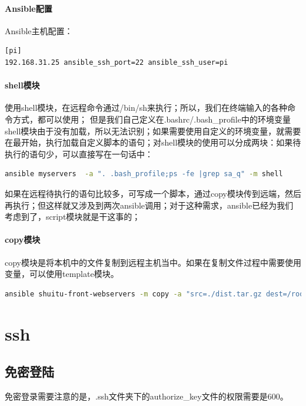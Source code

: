 \documentclass[letter]{book}
\begin{document}
\paragraph{Ansible配置}

Ansible主机配置：

\begin{lstlisting}[language=bash]
[pi]
192.168.31.25 ansible_ssh_port=22 ansible_ssh_user=pi
\end{lstlisting}


\paragraph{shell模块}使用shell模块，在远程命令通过/bin/sh来执行；所以，我们在终端输入的各种命令方式，都可以使用； 但是我们自己定义在.bashrc/.bash\_profile中的环境变量shell模块由于没有加载，所以无法识别；如果需要使用自定义的环境变量，就需要在最开始，执行加载自定义脚本的语句；对shell模块的使用可以分成两块：如果待执行的语句少，可以直接写在一句话中：

\begin{lstlisting}[language=bash]
ansible myservers  -a ". .bash_profile;ps -fe |grep sa_q" -m shell
\end{lstlisting}

如果在远程待执行的语句比较多，可写成一个脚本，通过copy模块传到远端，然后再执行；但这样就又涉及到两次ansible调用；对于这种需求，ansible已经为我们考虑到了，script模块就是干这事的；

\paragraph{copy模块}copy模块是将本机中的文件复制到远程主机当中。如果在复制文件过程中需要使用变量，可以使用template模块。

\begin{lstlisting}[language=bash]
ansible shuitu-front-webservers -m copy -a "src=./dist.tar.gz dest=/root/app-soft/"
\end{lstlisting}

\section{ssh}

\subsection{免密登陆}

免密登录需要注意的是，.ssh文件夹下的authorize\_key文件的权限需要是600。
\end{document}
